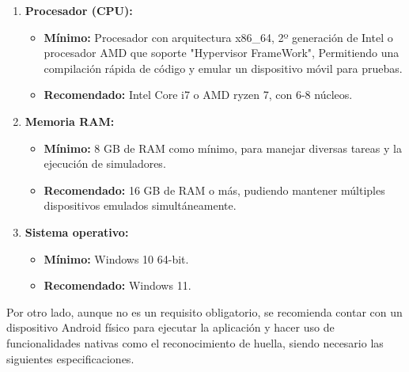 \begin{enumerate}

\item\textbf{Procesador (CPU):}
	\begin{itemize}
	\item\textbf{Mínimo:} Procesador con arquitectura x86\_64, 2º generación de Intel o procesador AMD que
	 soporte "Hypervisor FrameWork", Permitiendo una compilación rápida de código y emular un dispositivo 	
	 móvil para pruebas.
	\item\textbf{Recomendado:} Intel Core i7 o AMD ryzen 7, con 6-8 núcleos.
	\end{itemize}
	
\item\textbf{Memoria RAM:}
	\begin{itemize}
	\item\textbf{Mínimo:} 8 GB de RAM como mínimo, para manejar diversas tareas y la ejecución de
	simuladores.
	\item\textbf{Recomendado:} 16 GB de RAM o más, pudiendo mantener múltiples dispositivos emulados
	simultáneamente.
	\end{itemize}
	
\item\textbf{Sistema operativo:}
	\begin{itemize}
	\item\textbf{Mínimo:} Windows 10 64-bit.
	\item\textbf{Recomendado:} Windows 11.
	\end{itemize}

\end{enumerate}

Por otro lado, aunque no es un requisito obligatorio, se recomienda contar con un dispositivo Android físico para ejecutar la aplicación y hacer uso de funcionalidades nativas como el reconocimiento de huella, siendo necesario las siguientes especificaciones.

